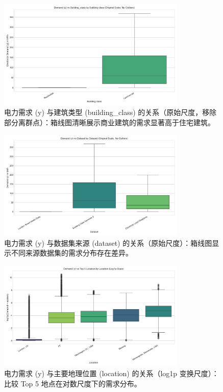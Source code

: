 \documentclass{article} %
\begin{document}
\begin{figure}[H]
    \centering
    \includegraphics[width=0.8\textwidth]{../plots/demand_vs_building_class_boxplot_orig.png}
    \caption{电力需求 (y) 与建筑类型 (building\_class) 的关系（原始尺度，移除部分离群点）：箱线图清晰展示商业建筑的需求显著高于住宅建筑。} %
    \label{fig:demand_vs_building_class_orig}
\end{figure}

\begin{figure}[H]
    \centering
    \includegraphics[width=0.8\textwidth]{../plots/demand_vs_dataset_boxplot_orig.png}
    \caption{电力需求 (y) 与数据集来源 (dataset) 的关系（原始尺度）：箱线图显示不同来源数据集的需求分布存在差异。} %
    \label{fig:demand_vs_dataset_orig}
\end{figure}

\begin{figure}[H]
    \centering
    \includegraphics[width=0.8\textwidth]{../plots/demand_vs_top5_location_boxplot_log1p.png}
    \caption{电力需求 (y) 与主要地理位置 (location) 的关系（log1p 变换尺度）：比较 Top 5 地点在对数尺度下的需求分布。} %
    \label{fig:demand_vs_location_log}
\end{figure}
\end{document}
